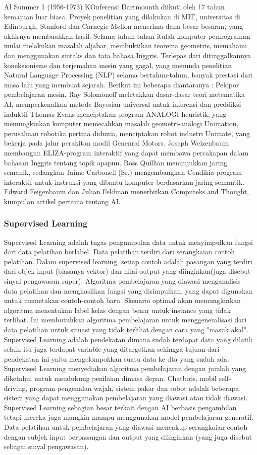 AI Summer 1 (1956-1973) KOnferensi Dartmounth diikuti oleh 17 tahun kemajuan luar biasa. Proyek penelitian yang dilakukan di MIT, universitas di Edinburgh, Stanford dan Carnegie Mellon menerima dana besar-besaran, yang akhirnya membuahkan hasil. Selama tahun-tahun itulah komputer pemrograman mulai melakukan masalah aljabar, membuktikan teorema geometris, memahami dan menggunakan sintaks dan tata bahasa Inggris. Terlepas dari ditinggalkannya koneksionisme dan terjemahan mesin yang gagal, yang menunda penelitian Natural Language Processing (NLP) selama bertahun-tahun, banyak prestasi dari masa lalu yang membuat sejarah. Berikut ini beberapa diantaranya : Pelopor pembelajaran mesin, Ray Solomonoff meletakkan dasar-dasar teori metematika AI, memperkenalkan metode Bayesian universal untuk inferensi dan preddiksi induktif Thomas Evans menciptakan program ANALOGI heuristik, yang memungkinkan komputer memecahkan masalah geometri-analogi Unimation, perusahaan robotika pertma didunia, menciptakan robot industri Unimate, yang bekerja pada jalur perakitan modil Genenral Motors. Joseph Weizenbaum membangun ELIZA-program interaktif yang dapat membawa percakapan dalam bahasan Inggris tentang topik apapun. Ross Quillian menunjukkan jaring semanik, sedangkan Jaime Carbonell (Sr.) mengembangkan Cendikia-program interaktif untuk instruksi yang dibantu komputer berdasarkan jaring semantik. Edward Feigenbaum dan Julian Feldman menerbitkan Computeks and Thought, kumpulan artikel pertama tentang AI.

\subsubsection{Supervised Learning}
Supervised Learning adalah tugas pengumpulan data untuk menyimpulkan fungsi dari data pelatihan berlabel. Data pelatihan terdiri dari serangkaian contoh pelatihan. Dalam supervised learning, setiap contoh adalah pasangan yang terdiri dari objek input (biasanya vektor) dan nilai output yang diinginkan(juga disebut sinyal pengawasan super). Algoritma pembelajaran yang diawasi menganalisis data pelatihan dan menghasilkan fungsi yang disimpulkan, yang dapat digunakan untuk memetakan contoh-contoh baru. Skenario optimal akan memungkinkan algoritma menentukan label kelas dengan benar untuk instance yang tidak terlihat. Ini membutuhkan algoritma pembelajaran untuk menggeneralisasi dari data pelatihan untuk situasi yang tidak terlihat dengan cara yang "masuk akal". Supervised Learning adalah pendekatan dimana sudah terdapat data yang dilatih selain itu juga terdapat variable yang ditargetkan sehingga tujuan dari pendekatan ini yaitu mengelompokkan suatu data ke dta yang sudah ada. Supervised Learning menyediakan algoritma pembelajaran dengan jumlah yang diketahui untuk mendukung penilaian dimasa depan. Chatbots, mobil self-driving, program pengenalan wajah, sistem pakar dan robot adalah beberapa sistem yang dapat menggunakan pembelajaran yang diawasi atau tidak diawasi. Supervised Learning sebagian besar terkait dengan AI berbasis pengambilan tetapi mereka juga mungkin mampu menggunakan model pembelajaran generatif. Data pelatihan untuk pembelajaran yang diawasi mencakup serangkaian contoh dengan subjek input berpasangan dan output yang diinginkan (yang juga disebut sebagai sinyal pengawasan).

